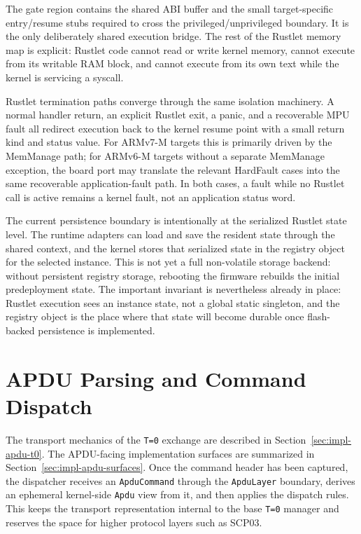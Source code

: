 The gate region contains the shared ABI buffer and the small target-specific
entry/resume stubs required to cross the privileged/unprivileged boundary. It
is the only deliberately shared execution bridge. The rest of the Rustlet
memory map is explicit: Rustlet code cannot read or write kernel memory, cannot
execute from its writable RAM block, and cannot execute from its own text while
the kernel is servicing a syscall.

Rustlet termination paths converge through the same isolation machinery. A
normal handler return, an explicit Rustlet exit, a panic, and a recoverable MPU
fault all redirect execution back to the kernel resume point with a small
return kind and status value. For ARMv7-M targets this is primarily driven by
the MemManage path; for ARMv6-M targets without a separate MemManage exception,
the board port may translate the relevant HardFault cases into the same
recoverable application-fault path. In both cases, a fault while no Rustlet call
is active remains a kernel fault, not an application status word.

The current persistence boundary is intentionally at the serialized Rustlet
state level. The runtime adapters can load and save the resident state through
the shared context, and the kernel stores that serialized state in the registry
object for the selected instance. This is not yet a full non-volatile storage
backend: without persistent registry storage, rebooting the firmware rebuilds
the initial predeployment state. The important invariant is nevertheless
already in place: Rustlet execution sees an instance state, not a global static
singleton, and the registry object is the place where that state will become
durable once flash-backed persistence is implemented.

\section{APDU Parsing and Command Dispatch}
\label{sec:impl-apdu-dispatch}

The transport mechanics of the \texttt{T=0} exchange are described in
Section~\ref{sec:impl-apdu-t0}. The APDU-facing implementation surfaces
are summarized in Section~\ref{sec:impl-apdu-surfaces}. Once the command
header has been captured, the dispatcher receives an
\texttt{ApduCommand} through the \texttt{ApduLayer} boundary, derives an
ephemeral kernel-side \texttt{Apdu} view from it, and then applies the
dispatch rules. This keeps the transport representation internal to the
base \texttt{T=0} manager and reserves the space for higher protocol
layers such as SCP03.

